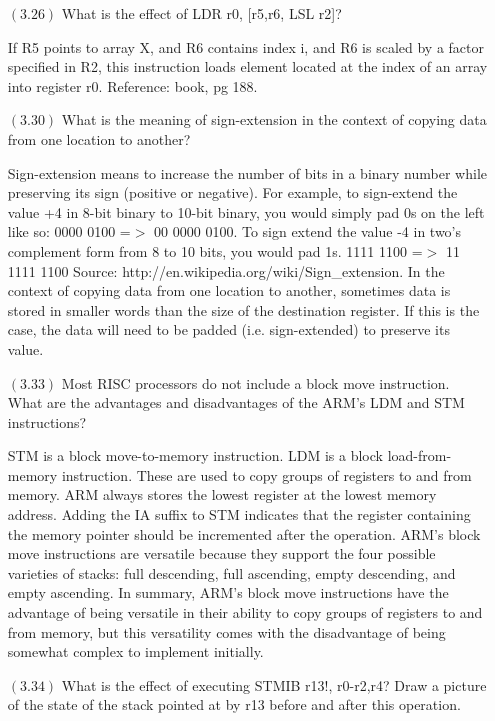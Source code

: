 \documentclass[letterpaper,10pt,titlepage]{article}
\begin{document}
\begin{enumerate}
\item[$(3.26)$] What is the effect of LDR r0, [r5,r6, LSL r2]?

If R5 points to array X, and R6 contains index i, and R6 is scaled by a factor specified in R2, this instruction loads element located at the index of an array into register r0. Reference: book, pg 188.


\item[$(3.30)$] What is the meaning of sign-extension in the context of copying data from one location to another?

Sign-extension means to increase the number of bits in a binary number while preserving its sign (positive or negative). For example, to sign-extend the value +4 in 8-bit binary to 10-bit binary, you would simply pad 0s on the left like so: 0000 0100 =$>$ 00 0000 0100. To sign extend the value -4 in two’s complement form from 8 to 10 bits, you would pad 1s. 1111 1100 =$>$ 11 1111 1100  Source: http://en.wikipedia.org/wiki/Sign\_extension. In the context of copying data from one location to another, sometimes data is stored in smaller words than the size of the destination register. If this is the case, the data will need to be padded (i.e. sign-extended) to preserve its value.


\item[$(3.33)$] Most RISC processors do not include a block move instruction. What are the advantages and disadvantages of the ARM’s LDM and STM instructions?

STM is a block move-to-memory instruction. LDM is a block load-from-memory instruction. These are used to copy groups of registers to and from memory. ARM always stores the lowest register at the lowest memory address. Adding the IA suffix to STM indicates that the register containing the memory pointer should be incremented after the operation. ARM’s block move instructions are versatile because they support the four possible varieties of stacks: full descending, full ascending, empty descending, and empty ascending. In summary, ARM’s block move instructions have the advantage of being versatile in their ability to copy groups of registers to and from memory, but this versatility comes with the disadvantage of being somewhat complex to implement initially.


\item[$(3.34)$] What is the effect of executing STMIB r13!, {r0-r2,r4}? Draw a picture of the state of the stack pointed at by r13 before and after this operation.


\end{enumerate}
\end{document}
